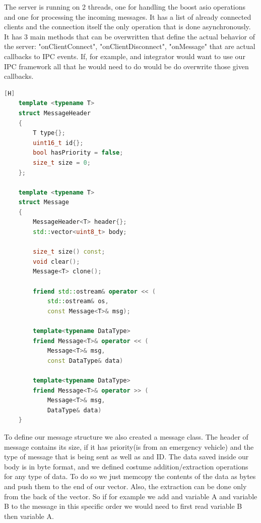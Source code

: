 \documentclass[17pt]{report}
\begin{document}
The server is running on 2 threads, one for handling the boost asio 
operations and one for processing the incoming messages. It has 
a list of already connected clients and the connection itself the only 
operation that is done asynchronously. It has 3 main methods that 
can be overwritten that define the actual behavior of the server: 
"onClientConnect", "onClientDisconnect", "onMessage" that are actual 
callbacks to IPC events. If, for example, and integrator would want 
to use our IPC framework all that he would need to do would be do 
overwrite those given callbacks.

\pagebreak

\begin{lstlisting}[caption={Message template}, language = C++][H]
    template <typename T>
    struct MessageHeader
    {
        T type{};
        uint16_t id{};
        bool hasPriority = false;
        size_t size = 0;
    };
    
    template <typename T>
    struct Message
    {
        MessageHeader<T> header{};
        std::vector<uint8_t> body;

        size_t size() const;
        void clear();
        Message<T> clone();

        friend std::ostream& operator << (
            std::ostream& os, 
            const Message<T>& msg);

        template<typename DataType>
        friend Message<T>& operator << (
            Message<T>& msg,
            const DataType& data)
        
        template<typename DataType>
        friend Message<T>& operator >> (
            Message<T>& msg,
            DataType& data)
    }
\end{lstlisting}  

To define our message structure we also created a message class. The 
header of message contains its size, if it has priority(is from 
an emergency vehicle) and the type of message that is being sent as
well as and ID. The data saved inside our body is in byte format, and 
we defined costume addition/extraction operations for any type of data.
To do so we just memcopy the contents of the data as bytes and push 
them to the end of our vector. Also, the extraction can be done only 
from the back of the vector. So if for example we add and variable 
A and variable B to the message in this specific order we would need 
to first read variable B then variable A.
\pagebreak
\end{document}

